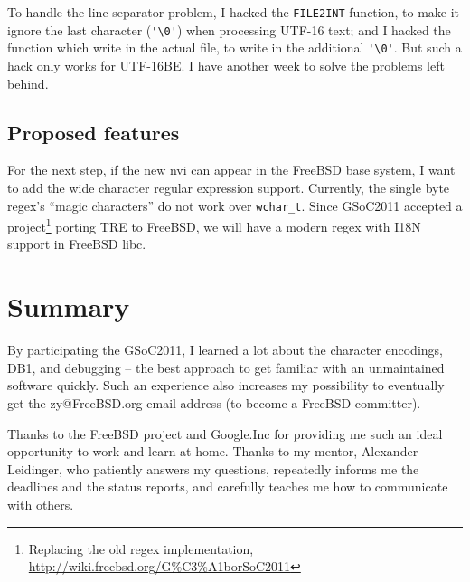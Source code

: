 \documentclass[11pt,twoside,a4paper]{article}
\begin{document}
\begin{mla}
To handle the line separator problem, I hacked the \verb|FILE2INT| function,
to make it ignore the last character (\verb|'\0'|) when processing UTF-16
text; and I hacked the function which write in the actual file, to write in
the additional \verb|'\0'|. But such a hack only works for UTF-16BE. I have
another week to solve the problems left behind.

\subsection{Proposed features}

For the next step, if the new nvi can appear in the FreeBSD base system, I
want to add the wide character regular expression support. Currently, the
single byte regex's ``magic characters'' do not work over \verb|wchar_t|.
Since GSoC2011 accepted a
project\footnote{Replacing the old regex implementation, \url{http://wiki.freebsd.org/G\%C3\%A1borSoC2011}} porting TRE to FreeBSD, we will have a
modern regex with I18N support in FreeBSD libc.

\section{Summary}

By participating the GSoC2011, I learned a lot about the character encodings,
DB1, and debugging -- the best approach to get familiar with an unmaintained
software quickly. Such an experience also increases my possibility to
eventually get the zy@FreeBSD.org email address (to become a FreeBSD
committer).

Thanks to the FreeBSD project and Google.Inc for providing me such an ideal
opportunity to work and learn at home. Thanks to my mentor, Alexander
Leidinger, who patiently answers my questions, repeatedly informs me the
deadlines and the status reports, and carefully teaches me how to communicate
with others.

\end{mla}
\end{document}
